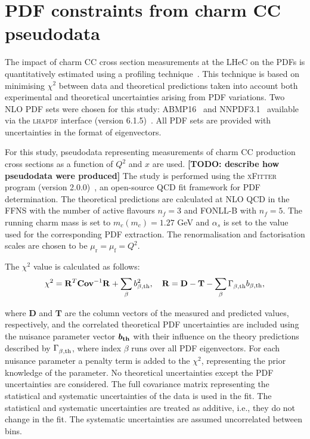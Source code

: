 \documentclass[pdftex,twocolumn,epjc3]{svjour3}          %
\newcommand{\abmp} {ABMP16\xspace}
\newcommand{\nnpdf} {NNPDF3.1\xspace}
\newcommand{\chisq}{\ensuremath{\chi^2}\xspace}
\newcommand{\xfitter} {\textsc{xFitter}\xspace}
\newcommand{\lhapdf} {{\textsc{lhapdf}}\xspace}
\begin{document}
\section{PDF constraints from charm CC pseudodata}
\label{sec:PDF}

The impact of charm CC cross section measurements at the LHeC on the PDFs is quantitatively estimated using a profiling technique~\cite{Paukkunen:2014zia}. This technique is based on minimising \chisq between data and theoretical predictions taken into account both experimental and theoretical uncertainties arising from PDF variations. Two NLO PDF sets were chosen for this study: 
\abmp~\cite{Alekhin:2018pai} and \nnpdf~\cite{Ball:2017nwa} available via the \lhapdf interface (version 6.1.5)~\cite{Buckley:2014ana}. 
All PDF sets are provided with uncertainties in the format of eigenvectors. 

For this study, pseudodata representing measurements of charm CC production cross sections as a function of $Q^2$ and $x$ are used. {\bf [TODO: describe how pseudodata were produced]}
The study is performed using the \xfitter program (version 2.0.0)~\cite{Alekhin:2014irh}, an open-source QCD fit framework for PDF determination. The theoretical predictions are calculated at NLO QCD in the FFNS with the number of active flavours $n_f = 3$ and FONLL-B with $n_f = 5$. The running charm mass is set to $m_c(m_c) = 1.27$ GeV and $\alpha_s$ is set to the value used for the corresponding PDF extraction.
The renormalisation and factorisation scales are chosen to be $\mu_\mathrm{r} = \mu_\mathrm{f} = Q^2$.

The \chisq value is calculated as follows:
\begin{equation}
\chisq = \mathbf{R}^{T}_{} \mathbf{Cov}^{-1}_{} \mathbf{R}_{} + \sum_{\beta} b_{\beta,\rm th}^2,~~~\mathbf{R} = \mathbf{D} - \mathbf{T} - \sum_{\beta} \Gamma^{}_{\beta,\rm th} b_{\beta,\rm th},
\label{eq:chisq}
\end{equation}

where $\mathbf{D}$ and $\mathbf{T}$ are the column vectors of the measured and predicted values, respectively, 
and the correlated theoretical PDF uncertainties are included using the nuisance parameter vector $\boldsymbol{b_{\rm th}}$ with their influence on the theory predictions described by $\Gamma^{}_{\beta,\rm th}$, where index $\beta$ runs over all PDF eigenvectors. 
For each nuisance parameter a penalty term is added to the \chisq, representing the prior knowledge of the parameter. 
No theoretical uncertainties except the PDF uncertainties are considered.
The full covariance matrix representing the statistical and systematic uncertainties of the data is used in the fit. The statistical and systematic uncertainties are treated as additive, i.e., they do not change in the fit. The systematic uncertainties are assumed uncorrelated between bins.
\end{document}
